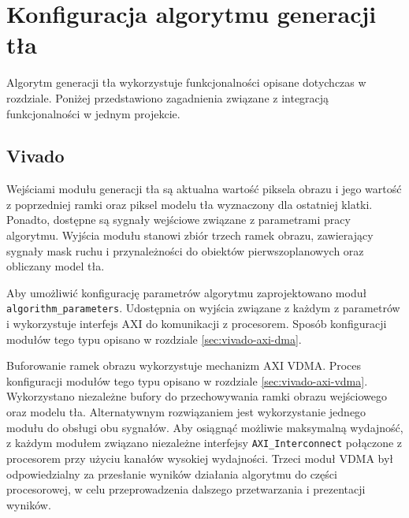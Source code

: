 
\section{Konfiguracja algorytmu generacji tła}
\label{sec:background-buffer-conf}

Algorytm generacji tła wykorzystuje funkcjonalności opisane dotychczas w rozdziale. Poniżej przedstawiono zagadnienia związane z integracją funkcjonalności w jednym projekcie.

\subsection{Vivado}

Wejściami modułu generacji tła są aktualna wartość piksela obrazu i jego wartość z poprzedniej ramki oraz piksel modelu tła wyznaczony dla ostatniej klatki. Ponadto, dostępne są sygnały wejściowe związane z parametrami pracy algorytmu. Wyjścia modułu stanowi zbiór trzech ramek obrazu, zawierający sygnały mask ruchu i przynależności do obiektów pierwszoplanowych oraz obliczany model tła.

Aby umożliwić konfigurację parametrów algorytmu zaprojektowano moduł \texttt{algorithm\_parameters}. Udostępnia on wyjścia związane z każdym z parametrów i wykorzystuje interfejs AXI do komunikacji z procesorem. Sposób konfiguracji modułów tego typu opisano w rozdziale \ref{sec:vivado-axi-dma}.

Buforowanie ramek obrazu wykorzystuje mechanizm AXI VDMA. Proces konfiguracji modułów tego typu opisano w rozdziale \ref{sec:vivado-axi-vdma}. Wykorzystano niezależne bufory do przechowywania ramki obrazu wejściowego oraz modelu tła. Alternatywnym rozwiązaniem jest wykorzystanie jednego modułu do obsługi obu sygnałów. Aby osiągnąć możliwie maksymalną wydajność, z każdym modułem związano niezależne interfejsy \texttt{AXI\_Interconnect} połączone z procesorem przy użyciu kanałów wysokiej wydajności.
Trzeci moduł VDMA był odpowiedzialny za przesłanie wyników działania algorytmu do części procesorowej, w celu przeprowadzenia dalszego przetwarzania i prezentacji wyników.

